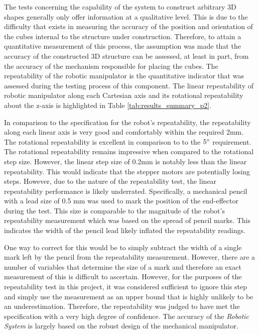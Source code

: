 The tests concerning the capability of the system to construct arbitrary 3D shapes generally only offer information at a qualitative level. This is due to the difficulty that exists in measuring the accuracy of the position and orientation of the cubes internal to the structure under construction. Therefore, to attain a quantitative measurement of this process, the assumption was made that the accuracy of the constructed 3D structure can be assessed, at least in part, from the accuracy of the mechanism responsible for placing the cubes. The repeatability of the robotic manipulator is the quantitative indicator that was assessed during the testing process of this component. The linear repeatability of robotic manipulator along each Cartesian axis and its rotational repeatability about the z-axis is highlighted in Table \ref{tab:results_summary_p2}.

In comparison to the specification for the robot's repeatability, the repeatability along each linear axis is very good and comfortably within the required 2mm. The rotational repeatability is excellent in comparison to to the $5^{\circ}$ requirement. The rotational repeatability remains impressive when compared to the rotational step size. However, the linear step size of 0.2mm is notably less than the linear repeatability. This would indicate that the stepper motors are potentially losing steps. However, due to the nature of the repeatability test, the linear repeatability performance is likely underrated. Specifically, a mechanical pencil with a lead size of 0.5 mm was used to mark the position of the end-effector during the test. This size is comparable to the magnitude of the robot's repeatability measurement which was based on the spread of pencil marks. This indicates the width of the pencil lead likely inflated the repeatability readings. 

One way to correct for this would be to simply subtract the width of a single mark left by the pencil from the repeatability measurement. However, there are a number of variables that determine the size of a mark and therefore an exact measurement of this is difficult to ascertain. However, for the purposes of the repeatability test in this project, it was considered sufficient to ignore this step and simply use the measurement as an upper bound that is highly unlikely to be an underestimation. Therefore, the repeatability was judged to have met the specification with a very high degree of confidence. The accuracy of the \textit{Robotic System} is largely based on the robust design of the mechanical manipulator.

